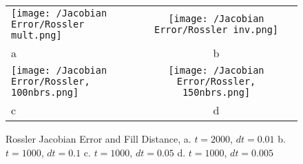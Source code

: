            \begin{figure}[H]
                \centering
                \begin{tabular}{lcc}
                    \texttt{[image: /Jacobian Error/Rossler mult.png]}&
                    \texttt{[image: /Jacobian Error/Rossler inv.png]}\\
                    \hfil a &b\\
                    \texttt{[image: /Jacobian Error/Rossler, 100nbrs.png]}&
                    \texttt{[image: /Jacobian Error/Rossler, 150nbrs.png]}\\
                    \hfil c &d\\
                \end{tabular}
                \caption{Rossler Jacobian Error and Fill Distance, a. $t=2000$, $dt=0.01$ b. $t=1000$, $dt=0.1$ c. $t=1000$, $dt=0.05$ d. $t=1000$, $dt=0.005$}\label{fig:rosslerjac3}
            \end{figure}

